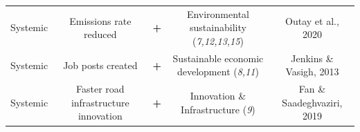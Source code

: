 \documentclass[
]{book}
\begin{document}
\begin{longtable}[]{@{}ccccc@{}}
\begin{minipage}[t]{0.17\columnwidth}\centering
Systemic\strut
\end{minipage} & \begin{minipage}[t]{0.16\columnwidth}\centering
Emissions rate reduced\strut
\end{minipage} & \begin{minipage}[t]{0.17\columnwidth}\centering
\textbf{+}\strut
\end{minipage} & \begin{minipage}[t]{0.17\columnwidth}\centering
Environmental sustainability (\emph{7,12,13,15})\strut
\end{minipage} & \begin{minipage}[t]{0.17\columnwidth}\centering
Outay et al., 2020\strut
\end{minipage}\tabularnewline
\begin{minipage}[t]{0.17\columnwidth}\centering
Systemic\strut
\end{minipage} & \begin{minipage}[t]{0.16\columnwidth}\centering
Job posts created\strut
\end{minipage} & \begin{minipage}[t]{0.17\columnwidth}\centering
\textbf{+}\strut
\end{minipage} & \begin{minipage}[t]{0.17\columnwidth}\centering
Sustainable economic development (\emph{8,11})\strut
\end{minipage} & \begin{minipage}[t]{0.17\columnwidth}\centering
Jenkins \& Vasigh, 2013\strut
\end{minipage}\tabularnewline
\begin{minipage}[t]{0.17\columnwidth}\centering
Systemic\strut
\end{minipage} & \begin{minipage}[t]{0.16\columnwidth}\centering
Faster road infrastructure innovation\strut
\end{minipage} & \begin{minipage}[t]{0.17\columnwidth}\centering
\textbf{+}\strut
\end{minipage} & \begin{minipage}[t]{0.17\columnwidth}\centering
Innovation \& Infrastructure (\emph{9})\strut
\end{minipage} & \begin{minipage}[t]{0.17\columnwidth}\centering
Fan \& Saadeghvaziri, 2019\strut
\end{minipage}\tabularnewline
\bottomrule
\end{longtable}
\end{document}
